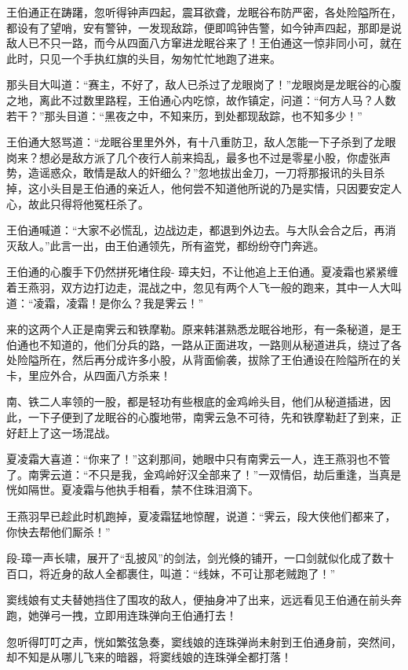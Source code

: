 \documentclass[12pt,oneside]{book}
\begin{document}
王伯通正在踌躇，忽听得钟声四起，震耳欲聋，龙眠谷布防严密，各处险隘所在，都设有了望哨，安有警钟，一发现敌踪，便即鸣钟告警，如今钟声四起，那即是说敌人已不只一路，而今从四面八方窜进龙眠谷来了！王伯通这一惊非同小可，就在此时，只见一个手执红旗的头目，匆匆忙忙地跑了进来。

那头目大叫道：``赛主，不好了，敌人已杀过了龙眼岗了！''龙眼岗是龙眠谷的心腹之地，离此不过数里路程，王伯通心内吃惊，故作镇定，问道：``何方人马？人数若干？''那头目道：``黑夜之中，不知来历，到处都现敌踪，也不知多少！''

王伯通大怒骂道：``龙眠谷里里外外，有十八重防卫，敌人怎能一下子杀到了龙眼岗来？想必是敌方派了几个夜行人前来捣乱，最多也不过是零星小股，你虚张声势，造谣惑众，敢情是敌人的奸细么？''忽地拔出金刀，一刀将那报讯的头目杀掉，这小头目是王伯通的亲近人，他何尝不知道他所说的乃是实情，只因要安定人心，故此只得将他冤枉杀了。

王伯通喊道：``大家不必慌乱，边战边走，都退到外边去。与大队会合之后，再消灭敌人。''此言一出，由王伯通领先，所有盗党，都纷纷夺门奔逃。

王伯通的心腹手下仍然拼死堵住段-
璋夫妇，不让他追上王伯通。夏凌霜也紧紧缠着王燕羽，双方边打边走，混战之中，忽见有两个人飞一般的跑来，其中一人大叫道：``凌霜，凌霜！是你么？我是霁云！''

来的这两个人正是南霁云和铁摩勒。原来韩湛熟悉龙眠谷地形，有一条秘道，是王伯通也不知道的，他们分兵的路，一路从正面进攻，一路则从秘道进兵，绕过了各处险隘所在，然后再分成许多小股，从背面偷袭，拔除了王伯通设在险隘所在的关卡，里应外合，从四面八方杀来！

南、铁二人率领的一股，都是轻功有些根底的金鸡岭头目，他们从秘道插进，因此，一下子便到了龙眠谷的心腹地带，南霁云急不可待，先和铁摩勒赶了到来，正好赶上了这一场混战。

夏凌霜大喜道：``你来了！''这刹那间，她眼中只有南霁云一人，连王燕羽也不管了。南霁云道：``不只是我，金鸡岭好汉全部来了！''一双情侣，劫后重逢，当真是恍如隔世。夏凌霜与他执手相看，禁不住珠泪滴下。

王燕羽早已趁此时机跑掉，夏凌霜猛地惊醒，说道：``霁云，段大侠他们都来了，你快去帮他们厮杀！''

段-璋一声长啸，展开了``乱披风''的剑法，剑光倏的铺开，一口剑就似化成了数十百口，将近身的敌人全都裹住，叫道：``线妹，不可让那老贼跑了！''

窦线娘有丈夫替她挡住了围攻的敌人，便抽身冲了出来，远远看见王伯通在前头奔跑，她弹弓一拽，立即用连珠弹向王伯通打去！

忽听得叮叮之声，恍如繁弦急奏，窦线娘的连珠弹尚未射到王伯通身前，突然间，却不知是从哪儿飞来的暗器，将窦线娘的连珠弹全都打落！
\end{document}
